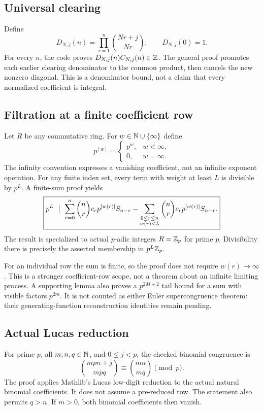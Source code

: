 \subsection*{Universal clearing}
Define
\[
 D_{N,j}(n)=\prod_{r=1}^{n}\binom{Nr+j}{Nr},\qquad D_{N,j}(0)=1.
\]
For every $n$, the code proves $D_{N,j}(n)C_{N,j}(n)\in\mathbb Z$. The general proof promotes each earlier clearing denominator to the common product, then cancels the new nonzero diagonal. This is a denominator bound, not a claim that every normalized coefficient is integral.
\par\medskip
{}
\subsection*{Filtration at a finite coefficient row}
Let $R$ be any commutative ring. For $w\in\mathbb N\cup\{\infty\}$ define
\[
 p^{[w]}=\begin{cases}p^w,&w<\infty,\\0,&w=\infty.\end{cases}
\]
The infinity convention expresses a vanishing coefficient, not an infinite exponent operation. For any finite index set, every term with weight at least $L$ is divisible by $p^L$. A finite-sum proof yields
\[
 \boxed{p^L\ \bigm|\ 
 \sum_{r=0}^{n}\binom nr c_rp^{[w(r)]}S_{n-r}
 -\sum_{\substack{0\le r\le n\\w(r)<L}}
     \binom nr c_rp^{[w(r)]}S_{n-r}.}
\]
The result is specialized to actual $p$-adic integers $R=\mathbb Z_p$ for prime $p$. Divisibility there is precisely the asserted membership in $p^L\mathbb Z_p$.

For an individual row the sum is finite, so the proof does not require $w(r)\to\infty$. This is a stronger coefficient-row scope, not a theorem about an infinite limiting process. A supporting lemma also proves a $p^{2M+2}$ tail bound for a sum with visible factors $p^{2m}$. It is not counted as either Euler supercongruence theorem: their generating-function reconstruction identities remain pending.

\subsection*{Actual Lucas reduction}
For prime $p$, all $m,n,q\in\mathbb N$, and $0\le j<p$, the checked binomial congruence is
\[
 \boxed{\binom{mpn+j}{mpq}\equiv\binom{mn}{mq}\pmod p.}
\]
The proof applies Mathlib's Lucas low-digit reduction to the actual natural binomial coefficients. It does not assume a pre-reduced row. The statement also permits $q>n$. If $m>0$, both binomial coefficients then vanish.

